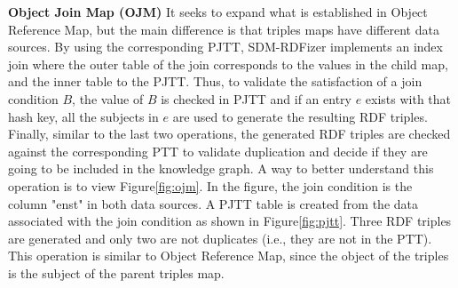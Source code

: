 \noindent\textbf{Object Join Map (OJM)}
It seeks to expand what is established in Object Reference Map, but the main difference is that triples maps have different data sources. By using the corresponding PJTT, SDM-RDFizer implements an index join where the outer table of the join corresponds to the values in the child map, and the inner table to the PJTT. Thus, to validate the satisfaction of a join condition $B$, the value of $B$ is checked in PJTT and if an entry $e$ exists with that hash key, all the subjects in $e$ are used to generate the resulting RDF triples. Finally, similar to the last two operations, the generated RDF triples are checked against the corresponding PTT to validate duplication and decide if they are going to be included in the knowledge graph. A way to better understand this operation is to view Figure\autoref{fig:ojm}. In the figure, the join condition is the column "enst" in both data sources. A PJTT table is created from the data associated with the join condition as shown in Figure\autoref{fig:pjtt}. Three RDF triples are generated and only two are not duplicates (i.e., they are not in the PTT). This operation is similar to Object Reference Map, since the object of the triples is the subject of the parent triples map. 
